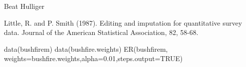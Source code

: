 %
\begin{Author}\relax
Beat Hulliger
\end{Author}
%
\begin{References}\relax
Little, R. and P. Smith (1987). 
Editing and imputation for quantitative survey data.
Journal of the American Statistical Association, 82, 58-68.
\end{References}
%
\begin{SeeAlso}\relax
{}
\end{SeeAlso}
%
\begin{Examples}
\begin{ExampleCode}
data(bushfirem)
data(bushfire.weights)
ER(bushfirem, weights=bushfire.weights,alpha=0.01,steps.output=TRUE)
\end{ExampleCode}
\end{Examples}
